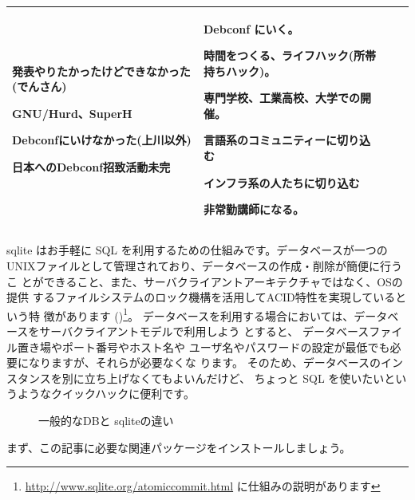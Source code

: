 \documentclass[mingoth,a4paper]{jsarticle}
\begin{document}
{\begin{tabular}[t]{|p{4em}|p{11em}|p{11em}|p{11em}|}
発表やりたかったけどできなかった(でんさん)

GNU/Hurd、SuperH

Debconfにいけなかった(上川以外)

日本へのDebconf招致活動未完

&

Debconf にいく。

時間をつくる、ライフハック(所帯持ちハック)。

専門学校、工業高校、大学での開催。


言語系のコミュニティーに切り込む

インフラ系の人たちに切り込む

非常勤講師になる。

&

\\
\hline
\end{tabular}
}


\label{sqlite3intro}

sqlite はお手軽に SQL を利用するための仕組みです。データベースが一つの
UNIXファイルとして管理されており、データベースの作成・削除が簡便に行うこ
とができること、また、サーバクライアントアーキテクチャではなく、OSの提供
するファイルシステムのロック機構を活用してACID特性を実現しているという特
徴があります
()\footnote{\url{http://www.sqlite.org/atomiccommit.html}
に仕組みの説明があります}。
データベースを利用する場合においては、データベースをサーバクライアントモデルで利用しよう
とすると、
データベースファイル置き場やポート番号やホスト名や
ユーザ名やパスワードの設定が最低でも必要になりますが、それらが必要なくな
ります。
そのため、データベースのインスタンスを別に立ち上げなくてもよいんだけど、
ちょっと SQL を使いたいというようなクイックハックに便利です。

\begin{figure}[ht]
\begin{center}
\end{center}
\caption{一般的なDBと sqliteの違い}\label{fig:sqlitestructure}
\end{figure}

まず、この記事に必要な関連パッケージをインストールしましょう。
\end{document}
